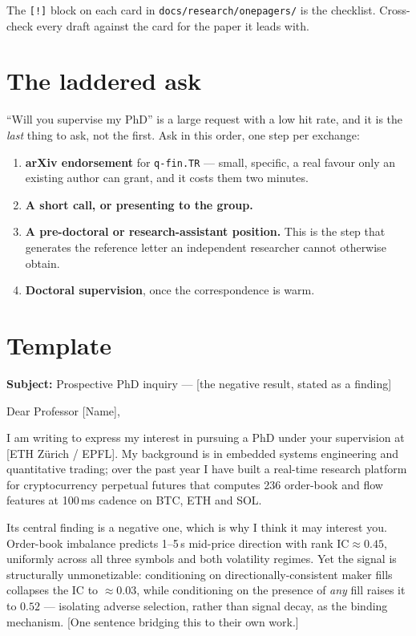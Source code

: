 \documentclass[11pt,a4paper]{article}
\begin{document}
The \texttt{[!]} block on each card in \texttt{docs/research/onepagers/} is the checklist. Cross-check
every draft against the card for the paper it leads with.

\section{The laddered ask}

``Will you supervise my PhD'' is a large request with a low hit rate, and it is the \emph{last} thing
to ask, not the first. Ask in this order, one step per exchange:

\begin{enumerate}
  \item \textbf{arXiv endorsement} for \texttt{q-fin.TR} --- small, specific, a real favour only an
        existing author can grant, and it costs them two minutes.
  \item \textbf{A short call, or presenting to the group.}
  \item \textbf{A pre-doctoral or research-assistant position.} This is the step that generates the
        reference letter an independent researcher cannot otherwise obtain.
  \item \textbf{Doctoral supervision}, once the correspondence is warm.
\end{enumerate}

\section{Template}

\noindent\textbf{Subject:} Prospective PhD inquiry --- [the negative result, stated as a finding]

\bigskip

\noindent Dear Professor [Name],

\medskip

I am writing to express my interest in pursuing a PhD under your supervision at [ETH Z\"urich / EPFL]. My background is in embedded systems engineering and quantitative trading; over the past year I have built a real-time research platform for cryptocurrency perpetual futures that computes 236 order-book and flow features at 100\,ms cadence on BTC, ETH and SOL.

\medskip

Its central finding is a negative one, which is why I think it may interest you. Order-book imbalance predicts 1--5\,s mid-price direction with rank $\text{IC} \approx 0.45$, uniformly across all three symbols and both volatility regimes. Yet the signal is structurally unmonetizable: conditioning on directionally-consistent maker fills collapses the $\text{IC}$ to $\approx 0.03$, while conditioning on the presence of \emph{any} fill raises it to $0.52$ --- isolating adverse selection, rather than signal decay, as the binding mechanism. [One sentence bridging this to their own work.]
\end{document}
